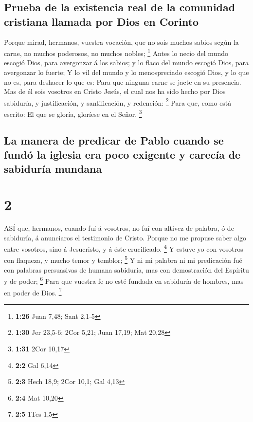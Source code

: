 \hypertarget{prueba-de-la-existencia-real-de-la-comunidad-cristiana-llamada-por-dios-en-corinto}{%
\subsection{Prueba de la existencia real de la comunidad cristiana
llamada por Dios en
Corinto}\label{prueba-de-la-existencia-real-de-la-comunidad-cristiana-llamada-por-dios-en-corinto}}

 Porque mirad, hermanos, vuestra vocación, que no sois
muchos sabios según la carne, no muchos poderosos, no muchos nobles;
\footnote{\textbf{1:26} Juan 7,48; Sant 2,1-5}  Antes lo
necio del mundo escogió Dios, para avergonzar á los sabios; y lo flaco
del mundo escogió Dios, para avergonzar lo fuerte;  Y lo
vil del mundo y lo menospreciado escogió Dios, y lo que no es, para
deshacer lo que es:  Para que ninguna carne se jacte en su
presencia.  Mas de él sois vosotros en Cristo Jesús, el
cual nos ha sido hecho por Dios sabiduría, y justificación, y
santificación, y redención: \footnote{\textbf{1:30} Jer 23,5-6; 2Cor
  5,21; Juan 17,19; Mat 20,28}  Para que, como está
escrito: El que se gloría, gloríese en el Señor. \footnote{\textbf{1:31}
  2Cor 10,17}

\hypertarget{la-manera-de-predicar-de-pablo-cuando-se-funduxf3-la-iglesia-era-poco-exigente-y-carecuxeda-de-sabiduruxeda-mundana}{%
\subsection{La manera de predicar de Pablo cuando se fundó la iglesia
era poco exigente y carecía de sabiduría
mundana}\label{la-manera-de-predicar-de-pablo-cuando-se-funduxf3-la-iglesia-era-poco-exigente-y-carecuxeda-de-sabiduruxeda-mundana}}

\hypertarget{section-1}{%
\section{2}\label{section-1}}

 ASÍ que, hermanos, cuando fuí á vosotros, no fuí con
altivez de palabra, ó de sabiduría, á anunciaros el testimonio de
Cristo.  Porque no me propuse saber algo entre vosotros,
sino á Jesucristo, y á éste crucificado. \footnote{\textbf{2:2} Gal 6,14}
 Y estuve yo con vosotros con flaqueza, y mucho temor y
temblor; \footnote{\textbf{2:3} Hech 18,9; 2Cor 10,1; Gal 4,13}
 Y ni mi palabra ni mi predicación fué con palabras
persuasivas de humana sabiduría, mas con demostración del Espíritu y de
poder; \footnote{\textbf{2:4} Mat 10,20}  Para que vuestra
fe no esté fundada en sabiduría de hombres, mas en poder de Dios.
\footnote{\textbf{2:5} 1Tes 1,5}

